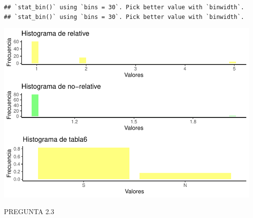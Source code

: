 \documentclass[
]{article}
\begin{document}
\begin{verbatim}
## `stat_bin()` using `bins = 30`. Pick better value with `binwidth`.
## `stat_bin()` using `bins = 30`. Pick better value with `binwidth`.
\end{verbatim}

\includegraphics{Practica_2_files/figure-latex/histobarras-1.pdf}

PREGUNTA 2.3
\end{document}
